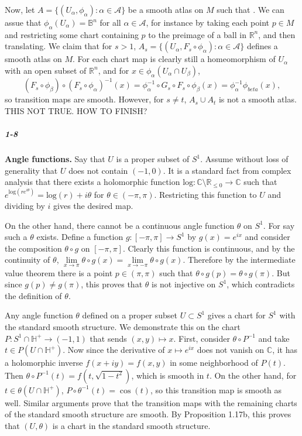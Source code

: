 \documentclass[10pt,letter]{article}
\begin{document}
Now, let $A = \lbrace (U_{\alpha},\phi_{\alpha}): \alpha \in \mathcal{A} \rbrace$ be a smooth atlas on $M$ such that . We can assue that $\phi_{\alpha}(U_\alpha) = \mathbb{B}^n$ for all $\alpha \in \mathcal{A}$, for instance by taking each point $p \in M$ and restricting some chart containing $p$ to the preimage of a ball in $\mathbb{R}^n$, and then translating. We claim that for $s > 1$, $A_s = \lbrace (U_{\alpha},F_s \circ \phi_{\alpha}): \alpha \in \mathcal{A} \rbrace$ defines a smooth atlas on $M$. For each chart map is clearly still a homeomorphism of $U_{\alpha}$ with an open subset of $\mathbb{R}^n$, and for $x \in \phi_{\alpha}(U_{\alpha} \cap U_{\beta})$, 
\begin{equation*}
(F_s \circ \phi_{\beta}) \circ (F_s \circ \phi_{\alpha})^{-1} (x) = \phi_{\alpha}^{-1} \circ G_s \circ F_s \circ \phi_{\beta}(x) = \phi_{\alpha}^{-1}  \phi_{beta}(x),
\end{equation*}
so transition maps are smooth. However, for $s \neq t$,  $A_s \cup A_t$ is not a smooth atlas. THIS NOT TRUE. HOW TO FINISH?

\subparagraph{1-8} \textbf{Angle functions.} Say that $U$ is a proper subset of $S^1$. Assume without loss of generality that $U$ does not contain $(-1,0)$. It is a standard fact from complex analysis that there exists a holomorphic function $\text{log}: \mathbb{C} \setminus \mathbb{R}_{\leq 0} \rightarrow \mathbb{C}$ such that $e^{\text{log}(re^{i\theta})} = \text{log}(r) + i\theta$ for $\theta \in (-\pi,\pi)$. Restricting this function to $U$ and dividing by $i$ gives the desired map. 

On the other hand, there cannot be a continuous angle function  $\theta$  on $S^1$.  For say such a $\theta$ exists. Define a function $g: [-\pi,\pi] \rightarrow S^1$ by $g(x) = e^{ix}$ and consider the composition $\theta \circ g$ on $[-\pi,\pi]$. Clearly this function is continuous, and by the continuity of $\theta$, $\lim \limits_{x \rightarrow \pi} \theta \circ g(x) = \lim \limits_{x \rightarrow -\pi} \theta \circ g(x)$. Therefore by the intermediate value theorem there is a point $p \in (\pi,\pi)$ such that $\theta \circ g(p) = \theta \circ g(\pi)$. But since $g(p) \neq g(\pi)$, this proves that $\theta$ is not injective on $S^1$, which contradicts the definition of $\theta$.

Any angle function $\theta$ defined on a proper subset $U \subset S^1$ gives a chart for $S^1$ with the standard smooth structure. We demonstrate this on the chart $P: S^1 \cap \mathbb{H}^+ \rightarrow (-1,1)$ that sends $(x,y) \mapsto x$. First, consider $\theta \circ P^{-1}$ and take $t \in P(U \cap \mathbb{H}^+)$. Now since the derivative of $x \mapsto e^{ix}$ does not vanish on $\mathbb{C}$, it has a holomorphic inverse $f(x+iy) = f(x,y)$ in some neighborhood of $P(t)$. Then $\theta \circ P^{-1}(t) = f(t,\sqrt{1-t^2})$, which is smooth in $t$. On the other hand, for $t \in \theta(U \cap \mathbb{H}^+)$, $P \circ \theta^{-1}(t) = \cos(t)$, so this transition map is smooth as well. Similar arguments prove that the transition maps with the remaining charts of the standard smooth structure are smooth. By Proposition 1.17b, this proves that $(U, \theta)$ is a chart in the standard smooth structure. 
\end{document}
